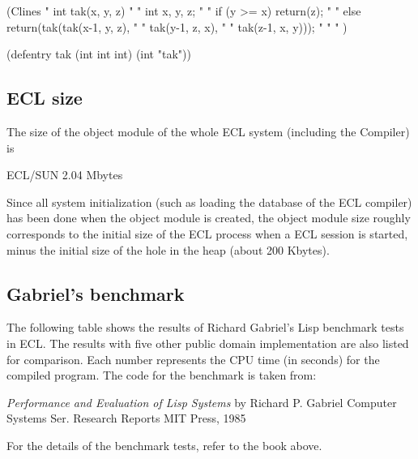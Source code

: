\begin{example}
    (Clines
    "   int tak(x, y, z)                       "
    "   int x, y, z;                           "
    "   {   if (y >= x) return(z);             "
    "       else return(tak(tak(x-1, y, z),    "
    "                       tak(y-1, z, x),    "
    "                       tak(z-1, x, y)));  "
    "   }                                      "
    )

    (defentry tak (int int int) (int "tak"))
\end{example}

\subsection{ECL size}

The size of the object module of the whole ECL system (including the Compiler)
is
\begin{example}
     ECL/SUN      2.04 Mbytes
\end{example}

Since all system initialization (such as loading the
database of the ECL compiler) has been done when the object module is
created, the object module size roughly corresponds to the initial
size of the ECL process when a ECL session is started, minus the
initial size of the hole in the heap (about 200 Kbytes).

\vspace{1 em}

\subsection{Gabriel's benchmark}

The following table shows the results of Richard Gabriel's Lisp
benchmark tests in ECL.  The results with five other public domain
\clisp{} implementation are also listed for comparison.  Each number
represents the CPU time (in seconds) for the compiled program.
The code for the benchmark is taken from:

\begin{center}
{\em Performance and Evaluation of Lisp Systems}
by
Richard P. Gabriel
Computer Systems Ser. Research Reports
MIT Press, 1985
\end{center}

\vspace{1 em}

For the details of the benchmark tests, refer to the book above.

